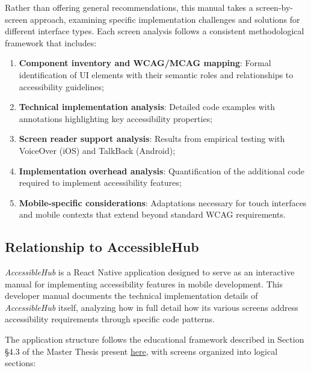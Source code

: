 Rather than offering general recommendations, this manual takes a screen-by-screen approach, examining specific implementation challenges and solutions for different interface types. Each screen analysis follows a consistent methodological framework that includes:

\begin{enumerate}
    \item \textbf{Component inventory and WCAG/MCAG mapping}: Formal identification of UI elements with their semantic roles and relationships to accessibility guidelines;
    
    \item \textbf{Technical implementation analysis}: Detailed code examples with annotations highlighting key accessibility properties;
    
    \item \textbf{Screen reader support analysis}: Results from empirical testing with VoiceOver (iOS) and TalkBack (Android);
    
    \item \textbf{Implementation overhead analysis}: Quantification of the additional code required to implement accessibility features;
    
    \item \textbf{Mobile-specific considerations}: Adaptations necessary for touch interfaces and mobile contexts that extend beyond standard WCAG requirements.
\end{enumerate}

\subsection{Relationship to AccessibleHub}
\label{subsec:dev-relation}

\textit{AccessibleHub} is a React Native application designed to serve as an interactive manual for implementing accessibility features in mobile development. This developer manual documents the technical implementation details of \textit{AccessibleHub} itself, analyzing how in full detail how its various screens address accessibility requirements through specific code patterns.

The application structure follows the educational framework described in Section §4.3 of the Master Thesis present \href{https://github.com/gabrielrovesti/Master-Thesis-UniPD/blob/main/Thesis/Thesis.pdf}{here}, with screens organized into logical sections:

